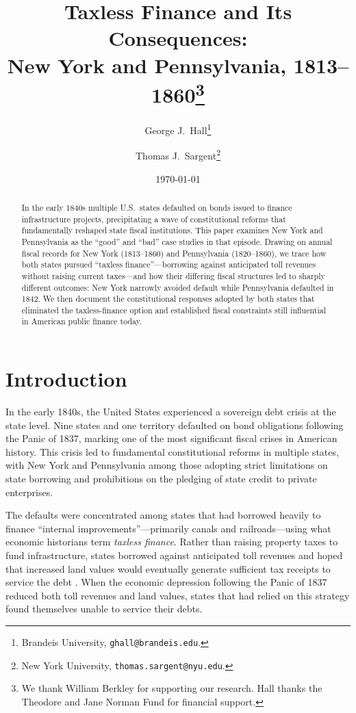 \documentclass[11pt]{article}
\title{Taxless Finance and Its Consequences:\\
New York and Pennsylvania, 1813--1860\footnote{We thank William Berkley
for supporting our research.  Hall thanks the Theodore and Jane Norman Fund for
financial support.}}
\author{George J.\ Hall\footnote{Brandeis University,
  \texttt{ghall@brandeis.edu}.} \and
Thomas J.\ Sargent\footnote{New York University,
  \texttt{thomas.sargent@nyu.edu}.}}
\date{\today}
\begin{document}
\graphicspath{{figures/}{Penn_figures/}}

\maketitle

\begin{abstract}
\noindent
In the early 1840s multiple U.S.\ states defaulted on bonds issued to
finance infrastructure projects, precipitating a wave of constitutional
reforms that fundamentally reshaped state fiscal institutions.  This
paper examines New York and Pennsylvania as the ``good'' and ``bad''
case studies in that episode.  Drawing on annual fiscal records for
New York (1813--1860) and Pennsylvania (1820--1860), we trace how both
states pursued ``taxless finance''---borrowing against anticipated toll
revenues without raising current taxes---and how their differing fiscal
structures led to sharply different outcomes: New York narrowly avoided
default while Pennsylvania defaulted in 1842.  We then document the
constitutional responses adopted by both states that eliminated the
taxless-finance option and established fiscal constraints still
influential in American public finance today.
\end{abstract}

\newpage
\tableofcontents
\newpage

\section{Introduction}
\label{sec:intro}

In the early 1840s, the United States experienced a sovereign debt crisis at
the state level.  Nine states and one territory defaulted on bond obligations
following the Panic of 1837, marking one of the most significant fiscal crises
in American history.  This crisis led to fundamental constitutional reforms in
multiple states, with New York and Pennsylvania among those adopting strict
limitations on state borrowing and prohibitions on the pledging of state credit
to private enterprises.

The defaults were concentrated among states that had borrowed heavily to finance
``internal improvements''---primarily canals and railroads---using what economic
historians term \emph{taxless finance}.  Rather than raising property taxes to
fund infrastructure, states borrowed against anticipated toll revenues and hoped
that increased land values would eventually generate sufficient tax receipts to
service the debt \citep{wallis2005constitutions}.  When the economic depression
following the Panic of 1837 reduced both toll revenues and land values, states
that had relied on this strategy found themselves unable to service their debts.
\end{document}
